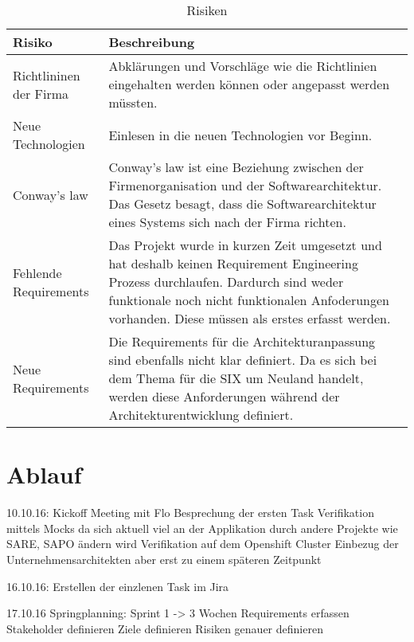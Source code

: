 \begin{table}[h!]
	\centering
	\caption{Risiken}
	\label{tab:table1}
	\begin{tabular}{ | p{2cm} | p{14cm} | }
		\toprule
		{\textbf{Risiko}} & {\textbf{Beschreibung}} \\
		\midrule
		Richtlininen der Firma & Abklärungen und Vorschläge wie die Richtlinien eingehalten werden können oder angepasst werden müssten. \\ \hline
		Neue Technologien & Einlesen in die neuen Technologien vor Beginn. \\ \hline
		Conway's law & Conway's law ist eine Beziehung zwischen der Firmenorganisation und der Softwarearchitektur. Das Gesetz besagt, dass die Softwarearchitektur eines Systems sich nach der Firma richten. \\ \hline
		Fehlende Requirements & Das Projekt wurde in kurzen Zeit umgesetzt und hat deshalb keinen Requirement Engineering Prozess durchlaufen. Dardurch sind weder funktionale noch nicht funktionalen Anfoderungen vorhanden. Diese müssen als erstes erfasst werden.\\ \hline
		Neue Requirements & Die Requirements für die Architekturanpassung sind ebenfalls nicht klar definiert. Da es sich bei dem Thema für die SIX um Neuland handelt, werden diese Anforderungen während der Architekturentwicklung definiert.\\
		\bottomrule
	\end{tabular}
\end{table}

\section{Ablauf}

10.10.16:
Kickoff Meeting mit Flo
Besprechung der ersten Task
Verifikation mittels Mocks da sich aktuell viel an der Applikation durch andere Projekte wie SARE, SAPO ändern wird
Verifikation auf dem Openshift Cluster
Einbezug der Unternehmensarchitekten aber erst zu einem späteren Zeitpunkt

16.10.16:
Erstellen der einzlenen Task im Jira

17.10.16
Springplanning:
Sprint 1 -> 3 Wochen
Requirements erfassen
Stakeholder definieren
Ziele definieren
Risiken genauer definieren
 